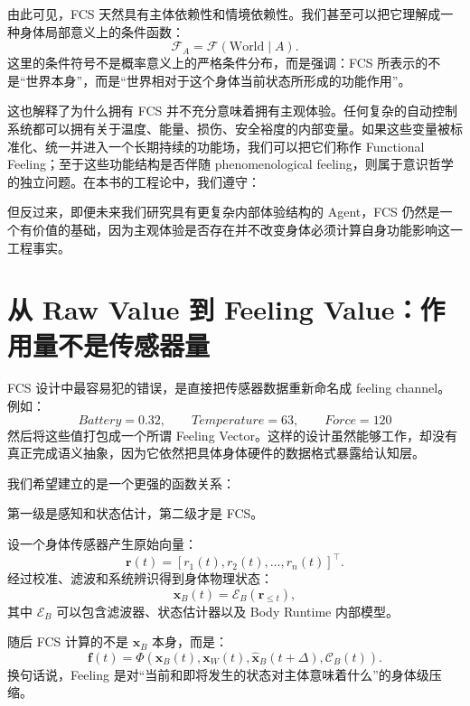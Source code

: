 由此可见，FCS 天然具有主体依赖性和情境依赖性。我们甚至可以把它理解成一种身体局部意义上的条件函数：
\[
\mathcal F_A
=
\mathcal F(\text{World}\mid A).
\]
这里的条件符号不是概率意义上的严格条件分布，而是强调：FCS 所表示的不是“世界本身”，而是“世界相对于这个身体当前状态所形成的功能作用”。

这也解释了为什么拥有 FCS 并不充分意味着拥有主观体验。任何复杂的自动控制系统都可以拥有关于温度、能量、损伤、安全裕度的内部变量。如果这些变量被标准化、统一并进入一个长期持续的功能场，我们可以把它们称作 Functional Feeling；至于这些功能结构是否伴随 phenomenological feeling，则属于意识哲学的独立问题。在本书的工程论中，我们遵守：
\begin{statementbox}
\centering
{}
\end{statementbox}
但反过来，即便未来我们研究具有更复杂内部体验结构的 Agent，FCS 仍然是一个有价值的基础，因为主观体验是否存在并不改变身体必须计算自身功能影响这一工程事实。

\section{从 Raw Value 到 Feeling Value：作用量不是传感器量}

FCS 设计中最容易犯的错误，是直接把传感器数据重新命名成 feeling channel。例如：
\[
Battery=0.32,\qquad
Temperature=63,\qquad
Force=120
\]
然后将这些值打包成一个所谓 Feeling Vector。这样的设计虽然能够工作，却没有真正完成语义抽象，因为它依然把具体身体硬件的数据格式暴露给认知层。

我们希望建立的是一个更强的函数关系：
\begin{statementbox}
\centering
{}
\end{statementbox}
第一级是感知和状态估计，第二级才是 FCS。

设一个身体传感器产生原始向量：
\[
\mathbf r(t)
=
[r_1(t),r_2(t),\ldots,r_n(t)]^\top.
\]
经过校准、滤波和系统辨识得到身体物理状态：
\[
\mathbf x_B(t)
=
\mathcal E_B(\mathbf r_{\le t}),
\]
其中 $\mathcal E_B$ 可以包含滤波器、状态估计器以及 Body Runtime 内部模型。

随后 FCS 计算的不是 $\mathbf x_B$ 本身，而是：
\[
\mathbf f(t)
=
\Phi
\left(
\mathbf x_B(t),
\mathbf x_W(t),
\hat{\mathbf x}_{B}(t+\Delta),
\mathcal C_B(t)
\right).
\]
换句话说，Feeling 是对“当前和即将发生的状态对主体意味着什么”的身体级压缩。

